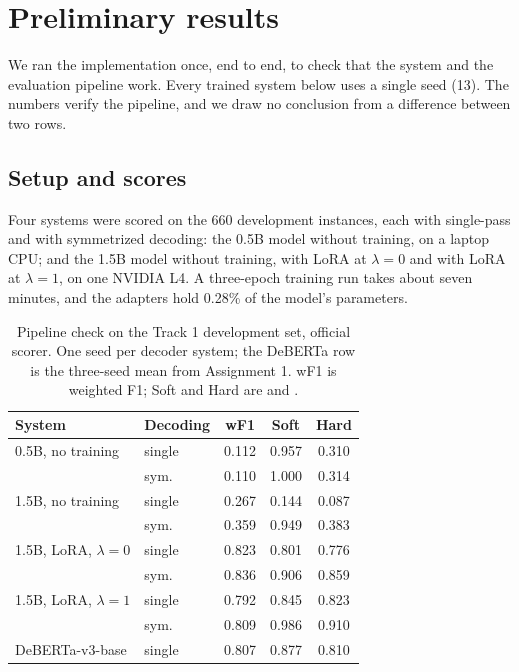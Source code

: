\section{Preliminary results}
\label{sec:preliminary}

We ran the implementation once, end to end, to check that the system and the evaluation pipeline work. Every trained system below uses a single seed (13). The numbers verify the pipeline, and we draw no conclusion from a difference between two rows.

\subsection{Setup and scores}

Four systems were scored on the 660 development instances, each with single-pass and with symmetrized decoding: the 0.5B model without training, on a laptop CPU; and the 1.5B model without training, with LoRA at $\lambda = 0$ and with LoRA at $\lambda = 1$, on one NVIDIA L4. A three-epoch training run takes about seven minutes, and the adapters hold 0.28\% of the model's parameters.

\begin{table}[t]
\centering
\small
\setlength{\tabcolsep}{4pt}
\begin{tabular}{@{}llccc@{}}
\toprule
System & Decoding & wF1 & Soft & Hard \\
\midrule
0.5B, no training & single & 0.112 & 0.957 & 0.310 \\
 & sym. & 0.110 & 1.000 & 0.314 \\
\addlinespace[2pt]
1.5B, no training & single & 0.267 & 0.144 & 0.087 \\
 & sym. & 0.359 & 0.949 & 0.383 \\
\addlinespace[2pt]
1.5B, LoRA, $\lambda = 0$ & single & 0.823 & 0.801 & 0.776 \\
 & sym. & 0.836 & 0.906 & 0.859 \\
\addlinespace[2pt]
1.5B, LoRA, $\lambda = 1$ & single & 0.792 & 0.845 & 0.823 \\
 & sym. & 0.809 & 0.986 & 0.910 \\
\midrule
DeBERTa-v3-base & single & 0.807 & 0.877 & 0.810 \\
\bottomrule
\end{tabular}
\caption{Pipeline check on the Track 1 development set, official scorer. One seed per decoder system; the DeBERTa row is the three-seed mean from Assignment 1. wF1 is weighted F1; Soft and Hard are \SoftCons{} and \HardCons{}.}
\label{tab:preliminary}
\end{table}

